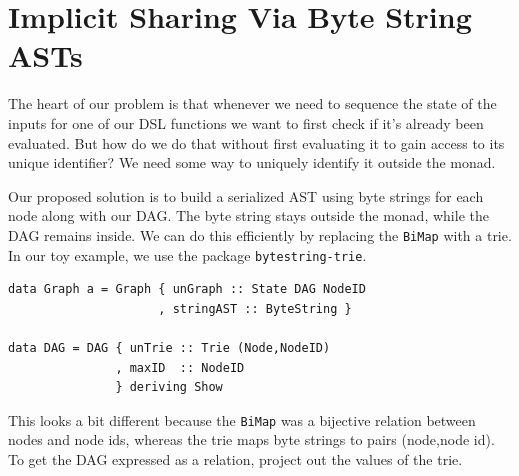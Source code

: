 \documentclass[runningheads]{llncs}
\begin{document}
\section{Implicit Sharing Via Byte String ASTs}

The heart of our problem is that whenever we need to sequence the state of the inputs
for one of our DSL functions we want to first check if it's already been
evaluated. But how do we do that without first evaluating it to gain access to
its unique identifier? We need some way to uniquely identify it outside the monad.

Our proposed solution is to build a serialized AST using byte strings for each node along with our
DAG.
The byte string stays outside the monad, while the DAG remains inside.
We can do this efficiently by replacing the \texttt{BiMap}
with a trie.
In our toy example, we use the package \texttt{bytestring-trie}.

\begin{verbatim}
data Graph a = Graph { unGraph :: State DAG NodeID
                     , stringAST :: ByteString }

data DAG = DAG { unTrie :: Trie (Node,NodeID)
               , maxID  :: NodeID
               } deriving Show
\end{verbatim}
This looks a bit different because the \texttt{BiMap}
was a bijective relation between nodes and node ids,
whereas the trie maps byte strings to pairs (node,node id).
To get the DAG expressed as a relation, project out the values of the trie.
\end{document}
